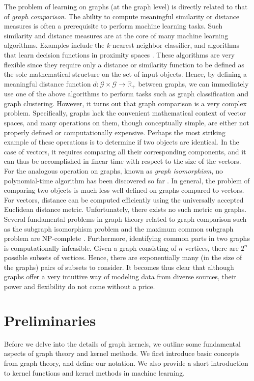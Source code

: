 \documentclass[twoside,11pt]{article}
\begin{document}
The problem of learning on graphs (at the graph level) is directly related to that of \textit{graph comparison}.
The ability to compute meaningful similarity or distance measures is often a prerequisite to perform machine learning tasks.
Such similarity and distance measures are at the core of many machine learning algorithms.
Examples include the $k$-nearest neighbor classifier, and algorithms that learn decision functions in proximity spaces .
These algorithms are very flexible since they require only a distance or similarity function to be defined as the sole mathematical structure on the set of input objects.
Hence, by defining a meaningful distance function $d: \mathcal{G} \times \mathcal{G} \rightarrow \mathbb{R}_+$ between graphs, we can immediately use one of the above algorithms to perform tasks such as graph classification and graph clustering.
However, it turns out that graph comparison is a very complex problem.
Specifically, graphs lack the convenient mathematical context of vector spaces, and many operations on them, though conceptually simple, are either not properly defined or computationally expensive.
Perhaps the most striking example of these operations is to determine if two objects are identical.
In the case of vectors, it requires comparing all their corresponding components, and it can thus be accomplished in linear time with respect to the size of the vectors.
For the analogous operation on graphs, known as \textit{graph isomorphism}, no polynomial-time algorithm has been discovered so far .
In general, the problem of comparing two objects is much less well-defined on graphs compared to vectors.
For vectors, distance can be computed efficiently using the universally accepted Euclidean distance metric.
Unfortunately, there exists no such metric on graphs.
Several fundamental problems in graph theory related to graph comparison such as the subgraph isomorphism problem and the maximum common subgraph problem are NP-complete .
Furthermore, identifying common parts in two graphs is computationally infeasible.
Given a graph consisting of $n$ vertices, there are $2^n$ possible subsets of vertices.
Hence, there are exponentially many (in the size of the graphs) pairs of subsets to consider.
It becomes thus clear that although graphs offer a very intuitive way of modeling data from diverse sources, their power and flexibility do not come without a price.

\section{Preliminaries}\label{sec:preliminaries}
Before we delve into the details of graph kernels, we outline some fundamental aspects of graph theory and kernel methods. 
We first introduce basic concepts from graph theory, and define our notation.
We also provide a short introduction to kernel functions and kernel methods in machine learning.
\end{document}
